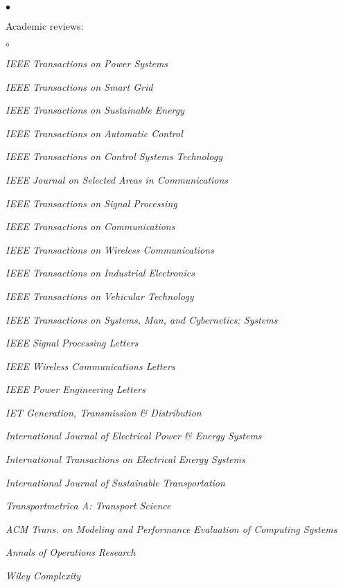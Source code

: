 \documentclass[margin,line]{res}
\newenvironment{list2}{
  \begin{list}{$\bullet$}{%
      \setlength{\itemsep}{0in}
      \setlength{\parsep}{0in} \setlength{\parskip}{0in}
      \setlength{\topsep}{0in} \setlength{\partopsep}{0in}
      \setlength{\leftmargin}{0.10in}}}{\end{list}}
\newenvironment{list3}{
  \begin{list}{$\circ$}{%
      \setlength{\itemsep}{0in}
      \setlength{\parsep}{0in} \setlength{\parskip}{0in}
      \setlength{\topsep}{0in} \setlength{\partopsep}{0in}
      \setlength{\leftmargin}{0.28in}}}{\end{list}}
\begin{document}
\begin{resume}
\section{}
\begin{list2}
\item Academic reviews:
\begin{list3}
\item \emph{IEEE Transactions on Power Systems}
\item \emph{IEEE Transactions on Smart Grid}
\item \emph{IEEE Transactions on Sustainable Energy}
\item \emph{IEEE Transactions on Automatic Control}
\item \emph{IEEE Transactions on Control Systems Technology}
\item \emph{IEEE Journal on Selected Areas in Communications}
\item \emph{IEEE Transactions on Signal Processing}
\item \emph{IEEE Transactions on Communications}
\item \emph{IEEE Transactions on Wireless Communications}
\item \emph{IEEE Transactions on Industrial Electronics}
\item \emph{IEEE Transactions on Vehicular Technology}
\item \emph{IEEE Transactions on Systems, Man, and Cybernetics: Systems}
\item \emph{IEEE Signal Processing Letters}
\item \emph{IEEE Wireless Communications Letters}
\item \emph{IEEE Power Engineering Letters}
\item \emph{IET Generation, Transmission \& Distribution}
\item \emph{International Journal of Electrical Power \& Energy Systems}
\item \emph{International Transactions on Electrical Energy Systems}
\item \emph{International Journal of Sustainable Transportation}
\item \emph{Transportmetrica A: Transport Science}
\item \emph{ACM Trans. on Modeling and Performance Evaluation of Computing Systems}
\item \emph{Annals of Operations Research} 
\item \emph{Wiley Complexity}

\end{list3}
\end{list2}
\end{resume}
\end{document}
